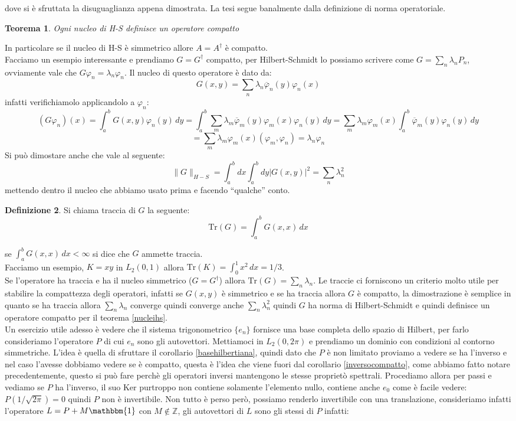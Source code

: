 \documentclass[12pt]{book}
\theoremstyle{plain}
\newtheorem{thm}{Teorema}[section]
\theoremstyle{definition}
\newtheorem{dfn}[thm]{Definizione}
\theoremstyle{remark}
\begin{document}
dove si è sfruttata la disuguaglianza appena dimostrata. La tesi segue banalmente dalla definizione di norma operatoriale.
\begin{thm}\label{nucleihs}
Ogni nucleo di H-S definisce un operatore compatto
\end{thm}
In particolare se il nucleo di H-S è simmetrico allore $A=A^\dagger$ è compatto.\\
Facciamo un esempio interessante e prendiamo $G=G^\dagger$ compatto, per Hilbert-Schmidt lo possiamo scrivere come $G = \sum_n \lambda_n P_n$, ovviamente vale che $G\varphi_n = \lambda_n\varphi_n$. Il nucleo di questo operatore è dato da:
\[G(x,y) = \sum_n \lambda_n \overline{\varphi}_n (y)\varphi_n(x)\] 
infatti verifichiamolo applicandolo a $\varphi_n$:
\[(G\varphi_n)(x) = \int_a^b G(x,y) \varphi_n(y)\,dy = \int_a^b \sum_m \lambda_m \overline{\varphi}_m (y)\varphi_m(x) \varphi_n(y)\,dy =\sum_m \lambda_m \varphi_m(x)\int_a^b \overline{\varphi}_m (y) \varphi_n(y)\,dy \]
\[ = \sum_m \lambda_m \varphi_m(x) ( \varphi_m, \varphi_n) = \lambda_n \varphi_n\]
Si può dimostare anche che vale al seguente:
\[\|G\|_{H-S} =\int_a^bdx\int_a^bdy|G(x,y)|^2 =\sum_n \lambda_n^2 \]
mettendo dentro il nucleo che abbiamo usato prima e facendo ``qualche'' conto.
\begin{dfn}
Si chiama traccia di $G$ la seguente:
\[\text{Tr}(G) = \int_a^b G(x,x)\,dx\]
\end{dfn}
se $\int_a^b G(x,x)\,dx<\infty$ si dice che $G$ ammette traccia.\\ Facciamo un esempio, $K= xy$ in $L_2(0,1)$ allora $\text{Tr}(K) =  \int_0^1 x^2\,dx = 1/3$.\\
Se l'operatore ha traccia e ha il nucleo simmetrico ($G=G^\dagger$) allora $\text{Tr}(G) = \sum_n \lambda_n$. Le traccie ci forniscono un criterio molto utile per stabilire la compattezza degli operatori, infatti se $G(x,y)$ è simmetrico e se ha traccia allora $G$ è compatto, la dimostrazione è semplice in quanto se ha traccia allora $\sum_n \lambda_n$ converge quindi converge anche $\sum_n \lambda_n^2$ quindi $G$ ha norma di Hilbert-Schmidt e quindi definisce un operatore compatto per il teorema \eqref{nucleihs}.\\ 
Un esercizio utile adesso è vedere che il sistema trigonometrico $\{e_n\}$ fornisce una base completa dello spazio di Hilbert, per farlo consideriamo l'operatore $P$ di cui $e_n$ sono gli autovettori. Mettiamoci in $L_2(0,2\pi)$ e prendiamo un dominio con condizioni al contorno simmetriche. L'idea è quella di sfruttare il corollario \eqref{basehilbertiana}, quindi dato che $P$ è non limitato proviamo a vedere se ha l'inverso e nel caso l'avesse dobbiamo vedere se è compatto, questa è l'idea che viene fuori dal corollario \eqref{inversocompatto}, come abbiamo fatto notare precedentemente, questo si può fare perchè gli operatori inversi mantengono le stesse proprietò spettrali. Procediamo allora per passi e vediamo se $P$ ha l'inverso, il suo Ker purtroppo non contiene solamente l'elemento nullo, contiene anche $e_0$ come è facile vedere: $P(1/\sqrt{2\pi}) = 0$ quindi $P$ non è invertibile. Non tutto è perso però, possiamo renderlo invertibile con una translazione, consideriamo infatti l'operatore $L = P + M\mathbbm{1}$ con $M\notin\mathbb{Z}$, gli autovettori di $L$ sono gli stessi di $P$ infatti:
\end{document}
